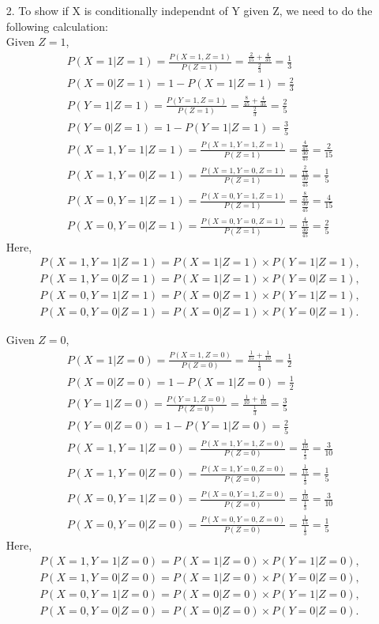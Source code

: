\documentclass[11pt]{article}
\begin{document}
\begin{itemize}
\item[2.]
To show if X is conditionally independnt of Y given Z, we need to do the following calculation:\\
Given $Z=1$, 
\begin{align*}
& P(X=1|Z=1)=\frac{P(X=1,Z=1)}{P(Z=1)}=\frac{\frac{2}{15}+\frac{4}{35}}{\frac{2}{3}}=\frac{1}{3} \\
& P(X=0|Z=1)=1-P(X=1|Z=1)=\frac{2}{3} \\
& P(Y=1|Z=1)=\frac{P(Y=1,Z=1)}{P(Z=1)}=\frac{\frac{8}{45}+\frac{4}{35}}{\frac{2}{3}}=\frac{2}{5} \\
& P(Y=0|Z=1)=1-P(Y=1|Z=1) = \frac{3}{5} \\
& P(X=1,Y=1|Z=1)=\frac{P(X=1,Y=1,Z=1)}{P(Z=1)}=\frac{\frac{4}{45}}{\frac{30}{45}}=\frac{2}{15} \\
& P(X=1,Y=0|Z=1)=\frac{P(X=1,Y=0,Z=1)}{P(Z=1)}=\frac{\frac{2}{15}}{\frac{30}{45}}=\frac{1}{5} \\
& P(X=0,Y=1|Z=1)=\frac{P(X=0,Y=1,Z=1)}{P(Z=1)}=\frac{\frac{8}{45}}{\frac{30}{45}}=\frac{4}{15} \\
& P(X=0,Y=0|Z=1)=\frac{P(X=0,Y=0,Z=1)}{P(Z=1)}=\frac{\frac{4}{15}}{\frac{30}{45}}=\frac{2}{5} 
\end{align*}
Here, 
\begin{align*}
& P(X=1,Y=1|Z=1)=P(X=1|Z=1) \times P(Y=1|Z=1), \\
& P(X=1,Y=0|Z=1)=P(X=1|Z=1) \times P(Y=0|Z=1), \\
& P(X=0,Y=1|Z=1)=P(X=0|Z=1) \times P(Y=1|Z=1), \\
& P(X=0,Y=0|Z=1)=P(X=0|Z=1) \times P(Y=0|Z=1).
\end{align*}

Given $Z=0$, 
\begin{align*}
& P(X=1|Z=0)=\frac{P(X=1,Z=0)}{P(Z=0)}=\frac{\frac{1}{15}+\frac{1}{10}}{\frac{1}{3}}=\frac{1}{2} \\
& P(X=0|Z=0)=1-P(X=1|Z=0)=\frac{1}{2} \\
& P(Y=1|Z=0)=\frac{P(Y=1,Z=0)}{P(Z=0)}=\frac{\frac{1}{10}+\frac{1}{10}}{\frac{1}{3}}=\frac{3}{5} \\
& P(Y=0|Z=0)=1-P(Y=1|Z=0) = \frac{2}{5} \\
& P(X=1,Y=1|Z=0)=\frac{P(X=1,Y=1,Z=0)}{P(Z=0)}=\frac{\frac{1}{10}}{\frac{1}{3}}=\frac{3}{10} \\
& P(X=1,Y=0|Z=0)=\frac{P(X=1,Y=0,Z=0)}{P(Z=0)}=\frac{\frac{1}{15}}{\frac{1}{3}}=\frac{1}{5} \\
& P(X=0,Y=1|Z=0)=\frac{P(X=0,Y=1,Z=0)}{P(Z=0)}=\frac{\frac{1}{10}}{\frac{1}{3}}=\frac{3}{10} \\
& P(X=0,Y=0|Z=0)=\frac{P(X=0,Y=0,Z=0)}{P(Z=0)}=\frac{\frac{1}{15}}{\frac{1}{3}}=\frac{1}{5} 
\end{align*}
Here, 
\begin{align*}
& P(X=1,Y=1|Z=0)=P(X=1|Z=0) \times P(Y=1|Z=0), \\
& P(X=1,Y=0|Z=0)=P(X=1|Z=0) \times P(Y=0|Z=0), \\
& P(X=0,Y=1|Z=0)=P(X=0|Z=0) \times P(Y=1|Z=0), \\
& P(X=0,Y=0|Z=0)=P(X=0|Z=0) \times P(Y=0|Z=0).
\end{align*}



\end{itemize}
\end{document}
